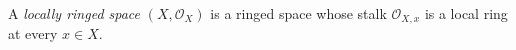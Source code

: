 
A \emph{locally ringed space} $(X,\mathcal O_X)$ is a ringed space whose stalk $\mathcal O_{X,x}$ is a local ring at every $x\in X$.
